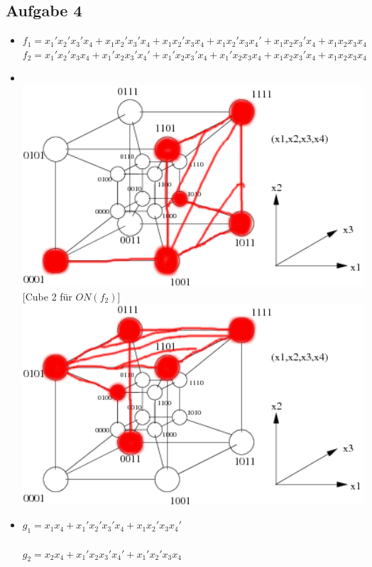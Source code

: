 \documentclass{scrartcl}
\begin{document}
	\subsection*{Aufgabe 4}
	\begin{itemize}
		\item[a)] 
		$f_1 = x_1'x_2'x_3'x_4 + x_1x_2'x_3'x_4  + x_1x_2'x_3x_4  + x_1x_2'x_3x_4' + x_1x_2x_3'x_4 + x_1x_2x_3x_4$ \\
		$f_2 = x_1'x_2'x_3x_4  + x_1'x_2x_3'x_4' + x_1'x_2x_3'x_4 + x_1'x_2x_3x_4 + x_1x_2x_3'x_4 + x_1x_2x_3x_4$
		\item[b)] [Cube 1 für $ON(f_1)$] \\
		\includegraphics[width=14cm]{hypercube1.png}
		[Cube 2 für $ON(f_2)$] \\
		\includegraphics[width=14cm]{hypercube2.png}
		
		\item[c)] $g_1 = x_1x_4 + x_1'x_2'x_3'x_4 + x_1x_2'x_3x_4' $ \\
		\\
		$g_2 = x_2x_4 + x_1'x_2x_3'x_4' + x_1'x_2'x_3x_4 $
		
	\end{itemize}
	
\end{document}
